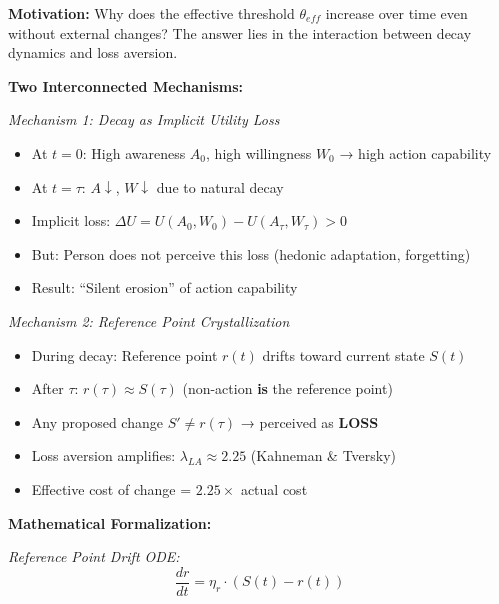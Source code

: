 
\begin{tcolorbox}[colback=red!5!white, colframe=red!75!black,
    title=\textbf{Extension UNTCM-X5: Status-Quo Lock-in via Loss Aversion}]

\textbf{Motivation:} Why does the effective threshold $\theta_{eff}$ increase over time even without external changes? The answer lies in the interaction between decay dynamics and loss aversion.

\textbf{Two Interconnected Mechanisms:}

\textit{Mechanism 1: Decay as Implicit Utility Loss}
\begin{itemize}[nosep]
\item At $t=0$: High awareness $A_0$, high willingness $W_0$ → high action capability
\item At $t=\tau$: $A \downarrow$, $W \downarrow$ due to natural decay
\item Implicit loss: $\Delta U = U(A_0, W_0) - U(A_\tau, W_\tau) > 0$
\item But: Person does not perceive this loss (hedonic adaptation, forgetting)
\item Result: ``Silent erosion'' of action capability
\end{itemize}

\textit{Mechanism 2: Reference Point Crystallization}
\begin{itemize}[nosep]
\item During decay: Reference point $r(t)$ drifts toward current state $S(t)$
\item After $\tau$: $r(\tau) \approx S(\tau)$ (non-action \textbf{is} the reference point)
\item Any proposed change $S' \neq r(\tau)$ → perceived as \textbf{LOSS}
\item Loss aversion amplifies: $\lambda_{LA} \approx 2.25$ (Kahneman \& Tversky)
\item Effective cost of change = $2.25 \times$ actual cost
\end{itemize}

\textbf{Mathematical Formalization:}

\textit{Reference Point Drift ODE:}
\begin{equation}
\frac{dr}{dt} = \eta_r \cdot (S(t) - r(t))
\label{eq:reference-drift}
\end{equation}


\end{tcolorbox}
